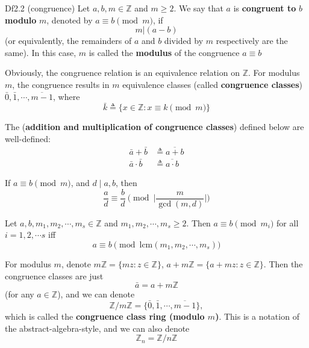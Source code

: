 \documentclass{article}
\newcommand{\lcm}{\text{lcm}}
\begin{document}
\begin{Df}{Df2.2 (congruence)}
    Let $a, b, m\in\mathbb{Z}$ and $m\geq 2$. We say that $a$ is \textbf{congruent to} $b$ \textbf{modulo} $m$, denoted by $a\equiv b\pmod{m}$, if
    $$ m|(a-b) $$
    (or equivalently, the remainders of $a$ and $b$ divided by $m$ respectively are the same). In this case, $m$ is called the \textbf{modulus} of the congruence $a\equiv b$
\end{Df}

\begin{Rmk}{}
    \begin{compactenum}
        \item \textcolor{Th}{Obviously, the congruence relation is an equivalence relation on $\mathbb{Z}$. For modulus $m$, the congruence results in $m$ equivalence classes} \textcolor{Df}{(called \textbf{congruence classes})} \textcolor{Th}{$\bar{0}, \bar{1}, \cdots, \overline{m-1}$, where}
        \textcolor{Df}{$$ \bar{k} \triangleq \{x\in\mathbb{Z}: x\equiv k\pmod{m}\} $$}
        \item \textcolor{Th}{The} \textcolor{Df}{(\textbf{addition and multiplication of congruence classes})} defined below are well-defined:
        \textcolor{Th}{$$ \begin{aligned}
            \bar{a} + \bar{b} &\triangleq \overline{a+b} \\
            \bar{a}\cdot \bar{b} &\triangleq \overline{a\cdot b}
        \end{aligned} $$}
        \item If $a\equiv b\pmod{m}$, and $d\mid a, b$, then
        $$ \frac{a}{d} \equiv \frac{b}{d}\pmod{\Bigg|\frac{m}{\gcd(m, d)}\Bigg|} $$
        \item Let $a, b, m_1, m_2,\cdots, m_s\in\mathbb{Z}$ and $m_1, m_2,\cdots, m_s\geq 2$. Then $a\equiv b\pmod{m_i}$ for all $i = 1, 2,\cdots s$ iff 
        $$ a\equiv b\pmod{\lcm(m_1, m_2,\cdots, m_s)} $$
        \item \textcolor{Df}{For modulus $m$, denote $m\mathbb{Z} = \{mz: z\in\mathbb{Z}\}$, $a + m\mathbb{Z} = \{a+mz: z\in\mathbb{Z}\}$.} \textcolor{Th}{Then the congruence classes are just
        $$ \bar{a} = a + m\mathbb{Z} $$
        (for any $a\in\mathbb{Z}$),} \textcolor{Df}{and we can denote
        $$ \mathbb{Z}/m\mathbb{Z} = \{\bar{0}, \bar{1}, \cdots, \overline{m-1}\}, $$
        which is called the \textbf{congruence class ring (modulo $m$)}. This is a notation of the abstract-algebra-style, and we can also denote
        $$ \mathbb{Z}_n = \mathbb{Z}/n\mathbb{Z} $$}
    \end{compactenum}
\end{Rmk}
\end{document}
